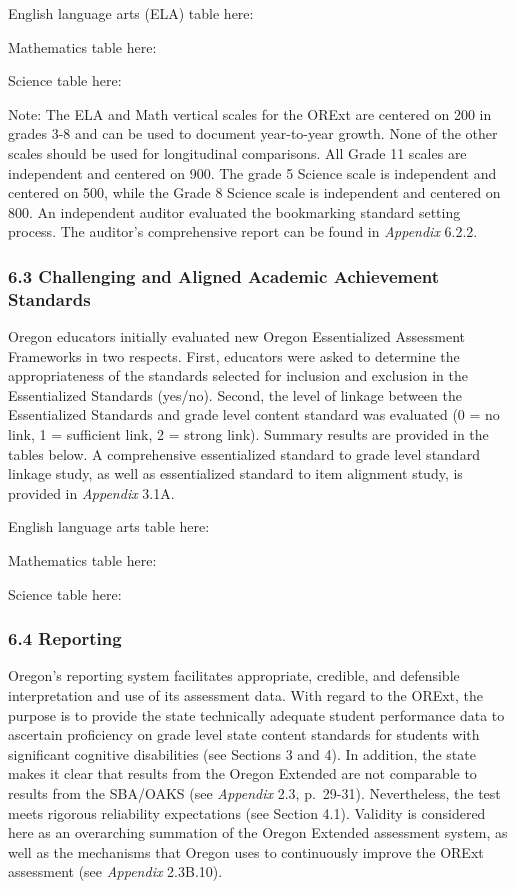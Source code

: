 \documentclass[]{article}
\begin{document}
English language arts (ELA) table here:

Mathematics table here:

Science table here:

Note: The ELA and Math vertical scales for the ORExt are centered on 200
in grades 3-8 and can be used to document year-to-year growth. None of
the other scales should be used for longitudinal comparisons. All Grade
11 scales are independent and centered on 900. The grade 5 Science scale
is independent and centered on 500, while the Grade 8 Science scale is
independent and centered on 800. An independent auditor evaluated the
bookmarking standard setting process. The auditor's comprehensive report
can be found in \emph{Appendix} 6.2.2.

\subsubsection{6.3 Challenging and Aligned Academic Achievement
Standards}\label{challenging-and-aligned-academic-achievement-standards}

Oregon educators initially evaluated new Oregon Essentialized Assessment
Frameworks in two respects. First, educators were asked to determine the
appropriateness of the standards selected for inclusion and exclusion in
the Essentialized Standards (yes/no). Second, the level of linkage
between the Essentialized Standards and grade level content standard was
evaluated (0 = no link, 1 = sufficient link, 2 = strong link). Summary
results are provided in the tables below. A comprehensive essentialized
standard to grade level standard linkage study, as well as essentialized
standard to item alignment study, is provided in \emph{Appendix} 3.1A.

English language arts table here:

Mathematics table here:

Science table here:

\subsubsection{6.4 Reporting}\label{reporting}

Oregon's reporting system facilitates appropriate, credible, and
defensible interpretation and use of its assessment data. With regard to
the ORExt, the purpose is to provide the state technically adequate
student performance data to ascertain proficiency on grade level state
content standards for students with significant cognitive disabilities
(see Sections 3 and 4). In addition, the state makes it clear that
results from the Oregon Extended are not comparable to results from the
SBA/OAKS (see \emph{Appendix} 2.3, p.~29-31). Nevertheless, the test
meets rigorous reliability expectations (see Section 4.1). Validity is
considered here as an overarching summation of the Oregon Extended
assessment system, as well as the mechanisms that Oregon uses to
continuously improve the ORExt assessment (see \emph{Appendix} 2.3B.10).
\end{document}
